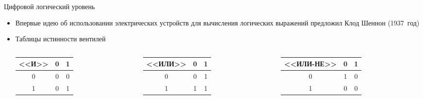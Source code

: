 \documentclass[aspectratio=169,14pt]{beamer}
\begin{document}
\begin{frame}{Цифровой логический уровень}
    \begin{itemize}
        \item Впервые идею об использовании электрических устройств для вычисления
        логических выражений предложил Клод Шеннон (1937~год)
        \item Таблицы истинности вентилей
        \begin{small}
        \begin{columns}[T,onlytextwidth]
            \begin{column}{0.3\textwidth}
                \begin{table}
                    \centering
                    \begin{tabular}{c|cc}
                        \textbf{<<И>>} & 0 & 1 \\ \hline
                        0 & 0 & 0 \\
                        1 & 0 & 1
                    \end{tabular}
                \end{table}
            \end{column}
            \begin{column}{0.3\textwidth}
                \begin{table}
                    \centering
                    \begin{tabular}{c|cc}
                        \textbf{<<ИЛИ>>} & 0 & 1 \\ \hline
                        0 & 0 & 1 \\
                        1 & 1 & 1
                    \end{tabular}
                \end{table}
            \end{column}
            \begin{column}{0.3\textwidth}
                \begin{table}
                    \centering
                    \begin{tabular}{c|cc}
                        \textbf{<<ИЛИ-НЕ>>} & 0 & 1 \\ \hline
                        0 & 1 & 0 \\
                        1 & 0 & 0
                    \end{tabular}
                \end{table}
            \end{column}

\end{columns}
\end{small}
\end{itemize}
\end{frame}
\end{document}
